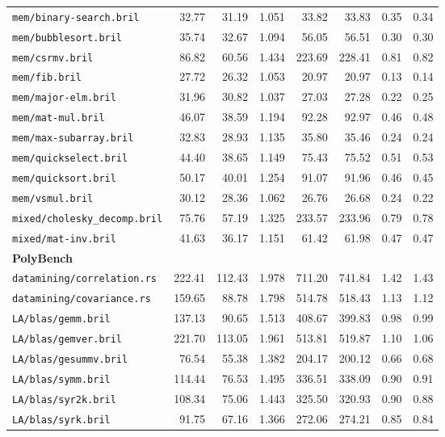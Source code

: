 \begin{longtable}{p{48mm}rrrrrrr}
\nolinkurl{mem/binary-search.bril} & 32.77 & 31.19 & 1.051 & 33.82 & 33.83 & 0.35 & 0.34 \\
\nolinkurl{mem/bubblesort.bril} & 35.74 & 32.67 & 1.094 & 56.05 & 56.51 & 0.30 & 0.30 \\
\nolinkurl{mem/csrmv.bril} & 86.82 & 60.56 & 1.434 & 223.69 & 228.41 & 0.81 & 0.82 \\
\nolinkurl{mem/fib.bril} & 27.72 & 26.32 & 1.053 & 20.97 & 20.97 & 0.13 & 0.14 \\
\nolinkurl{mem/major-elm.bril} & 31.96 & 30.82 & 1.037 & 27.03 & 27.28 & 0.22 & 0.25 \\
\nolinkurl{mem/mat-mul.bril} & 46.07 & 38.59 & 1.194 & 92.28 & 92.97 & 0.46 & 0.48 \\
\nolinkurl{mem/max-subarray.bril} & 32.83 & 28.93 & 1.135 & 35.80 & 35.46 & 0.24 & 0.24 \\
\nolinkurl{mem/quickselect.bril} & 44.40 & 38.65 & 1.149 & 75.43 & 75.52 & 0.51 & 0.53 \\
\nolinkurl{mem/quicksort.bril} & 50.17 & 40.01 & 1.254 & 91.07 & 91.96 & 0.46 & 0.45 \\
\nolinkurl{mem/vsmul.bril} & 30.12 & 28.36 & 1.062 & 26.76 & 26.68 & 0.24 & 0.22 \\
\nolinkurl{mixed/cholesky_decomp.bril} & 75.76 & 57.19 & 1.325 & 233.57 & 233.96 & 0.79 & 0.78 \\
\nolinkurl{mixed/mat-inv.bril} & 41.63 & 36.17 & 1.151 & 61.42 & 61.98 & 0.47 & 0.47 \\
\multicolumn{8}{l}{\textbf{PolyBench}}\\*
\nolinkurl{datamining/correlation.rs} & 222.41 & 112.43 & 1.978 & 711.20 & 741.84 & 1.42 & 1.43 \\
\nolinkurl{datamining/covariance.rs} & 159.65 & 88.78 & 1.798 & 514.78 & 518.43 & 1.13 & 1.12 \\
\nolinkurl{LA/blas/gemm.bril} & 137.13 & 90.65 & 1.513 & 408.67 & 399.83 & 0.98 & 0.99 \\
\nolinkurl{LA/blas/gemver.bril} & 221.70 & 113.05 & 1.961 & 513.81 & 519.87 & 1.10 & 1.06 \\
\nolinkurl{LA/blas/gesummv.bril} & 76.54 & 55.38 & 1.382 & 204.17 & 200.12 & 0.66 & 0.68 \\
\nolinkurl{LA/blas/symm.bril} & 114.44 & 76.53 & 1.495 & 336.51 & 338.09 & 0.90 & 0.91 \\
\nolinkurl{LA/blas/syr2k.bril} & 108.34 & 75.06 & 1.443 & 325.50 & 320.93 & 0.90 & 0.88 \\
\nolinkurl{LA/blas/syrk.bril} & 91.75 & 67.16 & 1.366 & 272.06 & 274.21 & 0.85 & 0.84 \\

\end{longtable}
